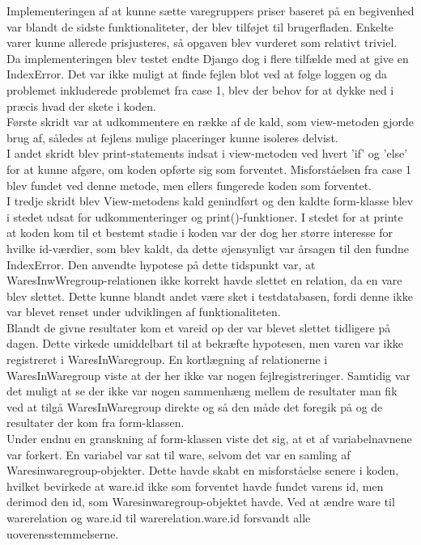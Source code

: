 \documentclass[]{article}
\begin{document}
Implementeringen af at kunne sætte varegruppers priser baseret på en begivenhed var blandt de sidste funktionaliteter, der blev tilføjet til brugerfladen. Enkelte varer kunne allerede prisjusteres, så opgaven blev vurderet som relativt triviel. Da implementeringen blev testet endte Django dog i flere tilfælde med at give en IndexError. Det var ikke muligt at finde fejlen blot ved at følge loggen og da problemet inkluderede problemet fra case 1, blev der behov for at dykke ned i præcis hvad der skete i koden.\\
\indent Første skridt var at udkommentere en række af de kald, som view-metoden gjorde brug af, således at fejlens mulige placeringer kunne isoleres delvist. \\
\indent I andet skridt blev print-statements indsat i view-metoden ved hvert 'if' og 'else' for at kunne afgøre, om koden opførte sig som forventet. Misforståelsen fra case 1 blev fundet ved denne metode, men ellers fungerede koden som forventet. \\
\indent I tredje skridt blev View-metodens kald genindført og den kaldte form-klasse blev i stedet udsat for udkommenteringer og print()-funktioner. I stedet for at printe at koden kom til et bestemt stadie i koden var der dog her større interesse for hvilke id-værdier, som blev kaldt, da dette øjensynligt var årsagen til den fundne IndexError. Den anvendte hypotese på dette tidspunkt var, at WaresInwWregroup-relationen ikke korrekt havde slettet en relation, da en vare blev slettet. Dette kunne blandt andet være sket i testdatabasen, fordi denne ikke var blevet renset under udviklingen af funktionaliteten.  \\
\indent Blandt de givne resultater kom et vareid op der var blevet slettet tidligere på dagen. Dette virkede umiddelbart til at bekræfte hypotesen, men varen var ikke registreret i WaresInWaregroup. En kortlægning af relationerne i WaresInWaregroup viste at der her ikke var nogen fejlregistreringer. Samtidig var det muligt at se der ikke var nogen sammenhæng mellem de resultater man fik ved at tilgå WaresInWaregroup direkte og så den måde det foregik på og de resultater der kom fra form-klassen.\\
\indent Under endnu en granskning af form-klassen viste det sig, at et af variabelnavnene var forkert. En variabel var sat til ware, selvom det var en samling af Waresinwaregroup-objekter. Dette havde skabt en misforståelse senere i koden, hvilket bevirkede at ware.id ikke som forventet havde fundet varens id, men derimod den id, som Waresinwaregroup-objektet havde. Ved at ændre ware til warerelation og ware.id til warerelation.ware.id forsvandt alle uoverensstemmelserne. 
\end{document}
